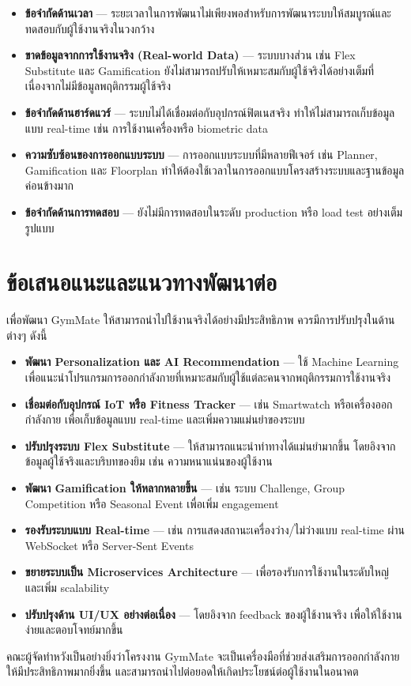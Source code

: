 \begin{itemize}
  \item \textbf{ข้อจำกัดด้านเวลา} — ระยะเวลาในการพัฒนาไม่เพียงพอสำหรับการพัฒนาระบบให้สมบูรณ์และทดสอบกับผู้ใช้งานจริงในวงกว้าง
  \item \textbf{ขาดข้อมูลจากการใช้งานจริง (Real-world Data)} — ระบบบางส่วน เช่น Flex Substitute และ Gamification ยังไม่สามารถปรับให้เหมาะสมกับผู้ใช้จริงได้อย่างเต็มที่ เนื่องจากไม่มีข้อมูลพฤติกรรมผู้ใช้จริง
  \item \textbf{ข้อจำกัดด้านฮาร์ดแวร์} — ระบบไม่ได้เชื่อมต่อกับอุปกรณ์ฟิตเนสจริง ทำให้ไม่สามารถเก็บข้อมูลแบบ real-time เช่น การใช้งานเครื่องหรือ biometric data
  \item \textbf{ความซับซ้อนของการออกแบบระบบ} — การออกแบบระบบที่มีหลายฟีเจอร์ เช่น Planner, Gamification และ Floorplan ทำให้ต้องใช้เวลาในการออกแบบโครงสร้างระบบและฐานข้อมูลค่อนข้างมาก
  \item \textbf{ข้อจำกัดด้านการทดสอบ} — ยังไม่มีการทดสอบในระดับ production หรือ load test อย่างเต็มรูปแบบ
\end{itemize}

\section{ข้อเสนอแนะและแนวทางพัฒนาต่อ}
\label{sec:future}

\noindent
เพื่อพัฒนา GymMate ให้สามารถนำไปใช้งานจริงได้อย่างมีประสิทธิภาพ ควรมีการปรับปรุงในด้านต่างๆ ดังนี้

\begin{itemize}
  \item \textbf{พัฒนา Personalization และ AI Recommendation} — ใช้ Machine Learning เพื่อแนะนำโปรแกรมการออกกำลังกายที่เหมาะสมกับผู้ใช้แต่ละคนจากพฤติกรรมการใช้งานจริง
  \item \textbf{เชื่อมต่อกับอุปกรณ์ IoT หรือ Fitness Tracker} — เช่น Smartwatch หรือเครื่องออกกำลังกาย เพื่อเก็บข้อมูลแบบ real-time และเพิ่มความแม่นยำของระบบ
  \item \textbf{ปรับปรุงระบบ Flex Substitute} — ให้สามารถแนะนำท่าทางได้แม่นยำมากขึ้น โดยอิงจากข้อมูลผู้ใช้จริงและบริบทของยิม เช่น ความหนาแน่นของผู้ใช้งาน
  \item \textbf{พัฒนา Gamification ให้หลากหลายขึ้น} — เช่น ระบบ Challenge, Group Competition หรือ Seasonal Event เพื่อเพิ่ม engagement
  \item \textbf{รองรับระบบแบบ Real-time} — เช่น การแสดงสถานะเครื่องว่าง/ไม่ว่างแบบ real-time ผ่าน WebSocket หรือ Server-Sent Events
  \item \textbf{ขยายระบบเป็น Microservices Architecture} — เพื่อรองรับการใช้งานในระดับใหญ่และเพิ่ม scalability
  \item \textbf{ปรับปรุงด้าน UI/UX อย่างต่อเนื่อง} — โดยอิงจาก feedback ของผู้ใช้งานจริง เพื่อให้ใช้งานง่ายและตอบโจทย์มากขึ้น
\end{itemize}

คณะผู้จัดทำหวังเป็นอย่างยิ่งว่าโครงงาน GymMate จะเป็นเครื่องมือที่ช่วยส่งเสริมการออกกำลังกายให้มีประสิทธิภาพมากยิ่งขึ้น และสามารถนำไปต่อยอดให้เกิดประโยชน์ต่อผู้ใช้งานในอนาคต
